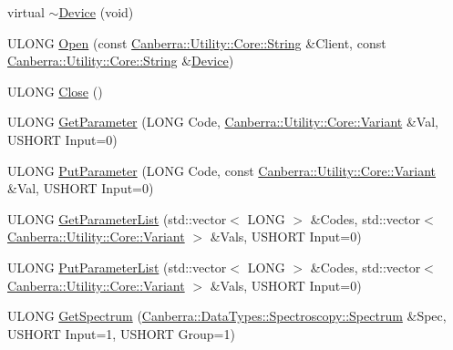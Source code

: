 \begin{DoxyCompactItemize}
\item 
virtual \hyperlink{class_canberra_1_1_protocols_1_1_lynx_1_1_device_a15622214b1e714c404d4772172d4f349_a15622214b1e714c404d4772172d4f349}{$\sim$\+Device} (void)
\item 
U\+L\+O\+NG \hyperlink{class_canberra_1_1_protocols_1_1_lynx_1_1_device_aece855a20d43a1676ec6ca0ab9917a49_aece855a20d43a1676ec6ca0ab9917a49}{Open} (const \hyperlink{class_canberra_1_1_utility_1_1_core_1_1_string}{Canberra\+::\+Utility\+::\+Core\+::\+String} \&Client, const \hyperlink{class_canberra_1_1_utility_1_1_core_1_1_string}{Canberra\+::\+Utility\+::\+Core\+::\+String} \&\hyperlink{class_canberra_1_1_protocols_1_1_lynx_1_1_device}{Device})
\item 
U\+L\+O\+NG \hyperlink{class_canberra_1_1_protocols_1_1_lynx_1_1_device_a0f7c10735473285afbc57765a673026e_a0f7c10735473285afbc57765a673026e}{Close} ()
\item 
U\+L\+O\+NG \hyperlink{class_canberra_1_1_protocols_1_1_lynx_1_1_device_a93c602c8408cc3355fc91b43f45247e2_a93c602c8408cc3355fc91b43f45247e2}{Get\+Parameter} (L\+O\+NG Code, \hyperlink{class_canberra_1_1_utility_1_1_core_1_1_variant}{Canberra\+::\+Utility\+::\+Core\+::\+Variant} \&Val, U\+S\+H\+O\+RT Input=0)
\item 
U\+L\+O\+NG \hyperlink{class_canberra_1_1_protocols_1_1_lynx_1_1_device_ad7b416ff1e42fa30dfef6e7a44faee92_ad7b416ff1e42fa30dfef6e7a44faee92}{Put\+Parameter} (L\+O\+NG Code, const \hyperlink{class_canberra_1_1_utility_1_1_core_1_1_variant}{Canberra\+::\+Utility\+::\+Core\+::\+Variant} \&Val, U\+S\+H\+O\+RT Input=0)
\item 
U\+L\+O\+NG \hyperlink{class_canberra_1_1_protocols_1_1_lynx_1_1_device_a33bd6bcde5356867647a30b1bd7ed343_a33bd6bcde5356867647a30b1bd7ed343}{Get\+Parameter\+List} (std\+::vector$<$ L\+O\+NG $>$ \&Codes, std\+::vector$<$ \hyperlink{class_canberra_1_1_utility_1_1_core_1_1_variant}{Canberra\+::\+Utility\+::\+Core\+::\+Variant} $>$ \&Vals, U\+S\+H\+O\+RT Input=0)
\item 
U\+L\+O\+NG \hyperlink{class_canberra_1_1_protocols_1_1_lynx_1_1_device_a2ba667c88f72053137db2d913f957d47_a2ba667c88f72053137db2d913f957d47}{Put\+Parameter\+List} (std\+::vector$<$ L\+O\+NG $>$ \&Codes, std\+::vector$<$ \hyperlink{class_canberra_1_1_utility_1_1_core_1_1_variant}{Canberra\+::\+Utility\+::\+Core\+::\+Variant} $>$ \&Vals, U\+S\+H\+O\+RT Input=0)
\item 
U\+L\+O\+NG \hyperlink{class_canberra_1_1_protocols_1_1_lynx_1_1_device_af6cdb15c1c210b5efef509fa501cf8f8_af6cdb15c1c210b5efef509fa501cf8f8}{Get\+Spectrum} (\hyperlink{class_canberra_1_1_data_types_1_1_spectroscopy_1_1_spectrum}{Canberra\+::\+Data\+Types\+::\+Spectroscopy\+::\+Spectrum} \&Spec, U\+S\+H\+O\+RT Input=1, U\+S\+H\+O\+RT Group=1)

\end{DoxyCompactItemize}

